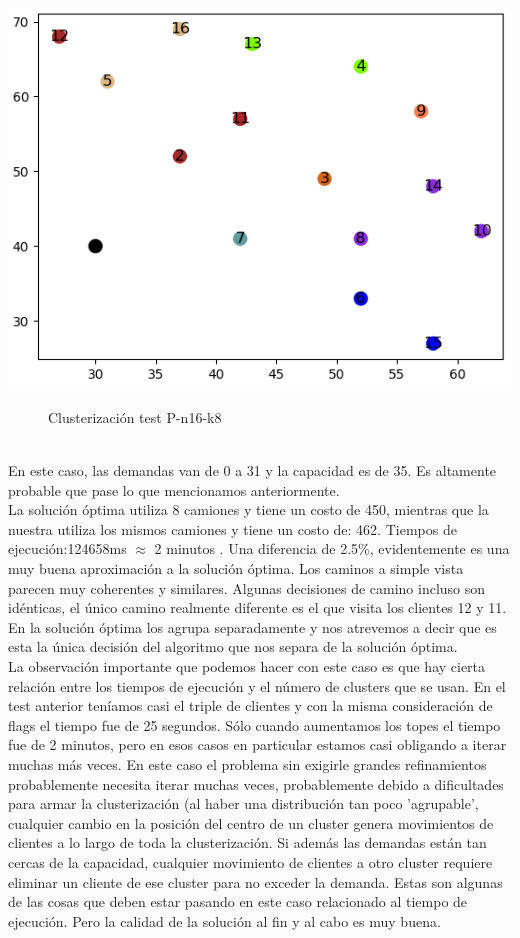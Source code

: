\documentclass[11pt,a4paper]{article}
\begin{document}
\bigskip
\includegraphics[scale=.5]{graficos/P-n16-k8/cluster.png}
\begin{figure}[!h]
\caption{Clusterización test P-n16-k8}
\end{figure}\\
En este caso, las demandas van de 0 a 31 y la capacidad es de 35. Es altamente probable que pase lo que mencionamos anteriormente. \\
La solución óptima utiliza 8 camiones y tiene un costo de 450, mientras que la nuestra utiliza los mismos camiones y tiene un costo de: 462. Tiempos de ejecución:124658ms $\approx$ 2 minutos . Una diferencia de 2.5\%, evidentemente es una muy buena aproximación a la solución óptima. Los caminos a simple vista parecen muy coherentes y similares. Algunas decisiones de camino incluso son idénticas, el único camino realmente diferente es el que visita los clientes 12 y 11. En la solución óptima los agrupa separadamente y nos atrevemos a decir que es esta la única decisión del algoritmo que nos separa de la solución óptima.
\\
La observación importante que podemos hacer con este caso es que hay cierta relación entre los tiempos de ejecución y el número de clusters que se usan. En el test anterior teníamos casi el triple de clientes y con la misma consideración de flags el tiempo fue de 25 segundos. Sólo cuando aumentamos los topes el tiempo fue de 2 minutos, pero en esos casos en particular estamos casi obligando a iterar muchas más veces. En este caso el problema sin exigirle grandes refinamientos probablemente necesita iterar muchas veces, probablemente debido a dificultades para armar la clusterización (al haber una distribución tan poco 'agrupable', cualquier cambio en la posición del centro de un cluster genera movimientos de clientes a lo largo de toda la clusterización. Si además las demandas están tan cercas de la capacidad, cualquier movimiento de clientes a otro cluster requiere eliminar un cliente de ese cluster para no exceder la demanda. Estas son algunas de las cosas que deben estar pasando en este caso relacionado al tiempo de ejecución. Pero la calidad de la solución al fin y al cabo es muy buena.\bigskip
\end{document}
